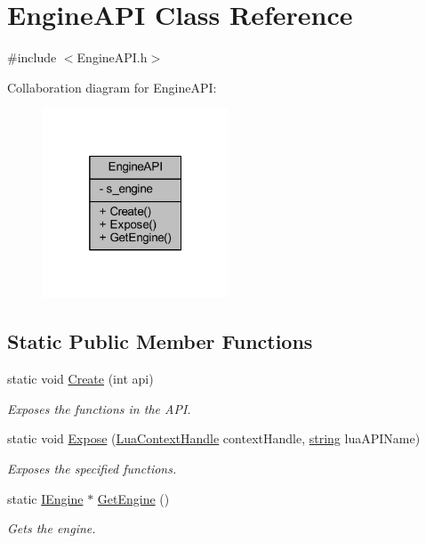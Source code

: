 \hypertarget{class_engine_a_p_i}{}\section{Engine\+A\+PI Class Reference}
\label{class_engine_a_p_i}


{\ttfamily \#include $<$Engine\+A\+P\+I.\+h$>$}



Collaboration diagram for Engine\+A\+PI\+:\nopagebreak
\begin{figure}[H]
\begin{center}
\leavevmode
\includegraphics[width=157pt]{class_engine_a_p_i__coll__graph}
\end{center}
\end{figure}
\subsection*{Static Public Member Functions}
\begin{DoxyCompactItemize}
\item 
static void \hyperlink{class_engine_a_p_i_a86c6e645c223e40e553f037217acb83d}{Create} (int api)
\begin{DoxyCompactList}\small\item\em Exposes the functions in the A\+PI. \end{DoxyCompactList}\item 
static void \hyperlink{class_engine_a_p_i_a3913e2d46563231d499ef12b0079e622}{Expose} (\hyperlink{_lua_context_8h_a2ffcc2d3ed21165072a1d7b61259bf14}{Lua\+Context\+Handle} context\+Handle, \hyperlink{_types_8h_ad453f9f71ce1f9153fb748d6bb25e454}{string} lua\+A\+P\+I\+Name)
\begin{DoxyCompactList}\small\item\em Exposes the specified functions. \end{DoxyCompactList}\item 
static \hyperlink{class_i_engine}{I\+Engine} $\ast$ \hyperlink{class_engine_a_p_i_a6cecc94147f6fed1c2f886c082051bc7}{Get\+Engine} ()
\begin{DoxyCompactList}\small\item\em Gets the engine. \end{DoxyCompactList}\end{DoxyCompactItemize}
